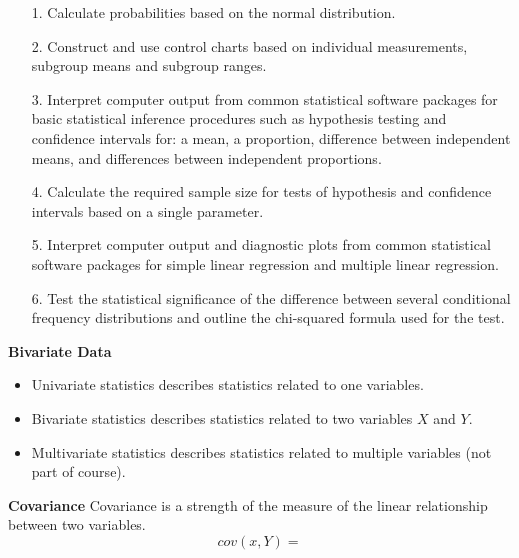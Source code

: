 \documentclass[]{report}
\begin{document}
\begin{itemize}
	\item[1.] Calculate probabilities based on the normal distribution.
	
	\item[2.] Construct and use control charts based on individual measurements, subgroup means and subgroup ranges.
	
	\item[3.] Interpret computer output from common statistical software packages for basic statistical inference procedures such as hypothesis testing and confidence intervals for: a mean, a proportion, difference between independent means, and differences between independent proportions.
	
	\item[4.] Calculate the required sample size for tests of hypothesis and confidence intervals based on a single parameter.
	
	\item[5.] Interpret computer output and diagnostic plots from common statistical software packages for simple linear regression and multiple linear regression.
	
	\item[6.] Test the statistical significance of the difference between several conditional frequency distributions and outline the chi-squared formula used for the test.
	
\end{itemize}







\noindent \textbf{Bivariate Data}
\begin{itemize}
	\item Univariate statistics describes statistics related to one variables.
	\item Bivariate statistics describes statistics related to two variables $X$ and $Y$.
	\item Multivariate statistics describes statistics related to multiple variables (not part of course).
\end{itemize}


%

\noindent \textbf{Covariance}
Covariance is a strength of the measure of the linear relationship between two variables.
\[ cov(x,Y) = \]
\end{document}
